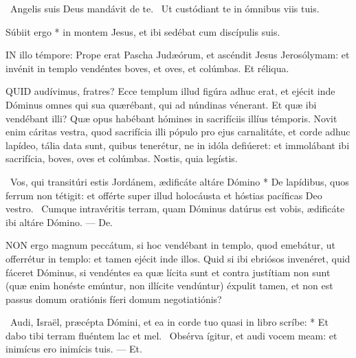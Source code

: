 

\V\ Angelis suis Deus mandávit de te. \R\ Ut custódiant te in ómnibus viis tuis.

 Súbiit ergo * in montem Jesus, et ibi sedébat cum discípulis suis.

\sectionornament




\lettrine[lines=2]{I}{N} illo témpore: Prope erat Pascha Judæórum, et ascéndit Jesus Jerosólymam: et invénit in templo vendéntes boves, et oves, et colúmbas. Et réliqua.



\lettrine[lines=2]{Q}{UID} audívimus, fratres? Ecce templum illud figúra adhuc erat, et ejécit inde Dóminus omnes qui sua quærébant, qui ad núndinas vénerant. Et quæ ibi vendébant illi? Quæ opus habébant hómines in sacrifíciis illíus témporis. Novit enim cáritas vestra, quod sacrifícia illi pópulo pro ejus carnalitáte, et corde adhuc lapídeo, tália data sunt, quibus tenerétur, ne in idóla defiúeret: et immolábant ibi sacrifícia, boves, oves et colúmbas. Nostis, quia legístis.

\R\ Vos, qui transitúri estis Jordánem, ædificáte altáre Dómino * De lapídibus, quos ferrum non tétigit: et offérte super illud holocáusta et hóstias pacíficas Deo vestro. \V\ Cumque intravéritis terram, quam Dóminus datúrus est vobis, ædificáte ibi altáre Dómino. --- De.


\lettrine[lines=2]{N}{ON} ergo magnum peccátum, si hoc vendébant in templo, quod emebátur, ut offerrétur in templo: et tamen ejécit inde illos. Quid si ibi ebriósos invenéret, quid fáceret Dóminus, si vendéntes ea quæ lícita sunt et contra justítiam non sunt (quæ enim honéste emúntur, non illícite vendúntur) éxpulit tamen, et non est passus domum oratiónis fíeri domum negotiatiónis?

\R\ Audi, Israël, præcépta Dómini, et ea in corde tuo quasi in libro scríbe: * Et dabo tibi terram fluéntem lac et mel. \V\ Obsérva ígitur, et audi vocem meam: et inimícus ero inimícis tuis. --- Et.

